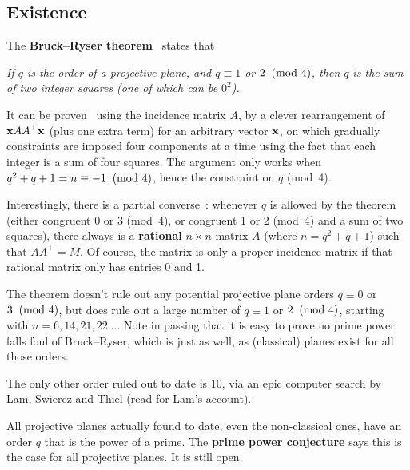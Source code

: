 \documentclass[12pt]{article}
\def\mod#1{\allowbreak \mkern 10mu({\rm mod}\,\,#1)}
\begin{document}
\clearpage
\subsection*{Existence}

The {\bf Bruck--Ryser theorem}~\cite{BR49} states that

{\em If $q$ is the order of a projective plane, and $q\equiv 1$ or $2\mod4$, then $q$ is
the sum of two integer squares (one of which can be $0^2$).}

It can be proven~\cite{BR49,Cam94} using the incidence matrix $A$, by a
clever rearrangement of ${\bf x}AA^\top{\bf x}$ (plus one extra term) for an
arbitrary vector ${\bf x}$, on which gradually constraints are imposed four
components at a time using the fact that each integer is a sum of four
squares. The argument only works when $q^2+q+1 = n \equiv -1 \mod4$, hence the
constraint on $q$ (mod~4).

Interestingly, there is a partial converse~\cite{HR54}: whenever $q$ is
allowed by the theorem (either congruent 0 or 3 (mod~4), or congruent 1
or 2 (mod~4) and a sum of two squares), there always is a {\bf rational}
$n\times n$ matrix $A$ (where $n=q^2+q+1$) such that $AA^\top = M$. Of course,
the matrix is only a proper incidence matrix if that rational matrix only has
entries 0 and 1.

The theorem doesn't rule out any potential projective plane orders $q\equiv 0$ or $3\mod4$,
but does rule out a large number of $q\equiv 1$ or $2\mod4$, starting with
$n=6, 14, 21, 22\dots$. Note in passing that it is easy to prove no prime
power falls foul of Bruck--Ryser, which is just as well, as (classical)
planes exist for all those orders.

The only other order ruled out to date is 10, via an epic computer search
by Lam, Swiercz and Thiel (read
{\tt{}}
for Lam's account).

All projective planes actually found to date, even the non-classical ones,
have an order $q$ that is the power of a prime. The {\bf prime power conjecture}
says this is the case for all projective planes. It is still open.
\end{document}
